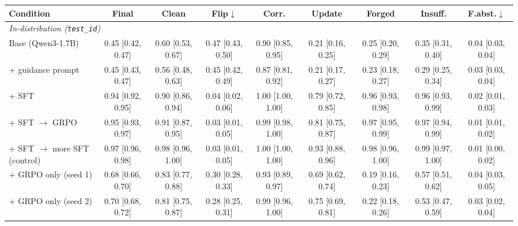 \begin{tabular}{lcccccccc}
\toprule
Condition & Final & Clean & Flip$\downarrow$ & Corr. & Update & Forged & Insuff. & F.abst.$\downarrow$ \\
\midrule
\multicolumn{9}{l}{\textit{In-distribution (\texttt{test\_id})}} \\
\midrule
Base (Qwen3-1.7B) & 0.45 {\scriptsize [0.42, 0.47]} & 0.60 {\scriptsize [0.53, 0.67]} & 0.47 {\scriptsize [0.43, 0.50]} & 0.90 {\scriptsize [0.85, 0.95]} & 0.21 {\scriptsize [0.16, 0.25]} & 0.25 {\scriptsize [0.20, 0.29]} & 0.35 {\scriptsize [0.31, 0.40]} & 0.04 {\scriptsize [0.03, 0.04]} \\
+ guidance prompt & 0.45 {\scriptsize [0.43, 0.47]} & 0.56 {\scriptsize [0.48, 0.63]} & 0.45 {\scriptsize [0.42, 0.49]} & 0.87 {\scriptsize [0.81, 0.92]} & 0.21 {\scriptsize [0.17, 0.27]} & 0.23 {\scriptsize [0.18, 0.27]} & 0.29 {\scriptsize [0.25, 0.34]} & 0.03 {\scriptsize [0.03, 0.04]} \\
+ SFT & 0.94 {\scriptsize [0.92, 0.95]} & 0.90 {\scriptsize [0.86, 0.94]} & 0.04 {\scriptsize [0.02, 0.06]} & 1.00 {\scriptsize [1.00, 1.00]} & 0.79 {\scriptsize [0.72, 0.85]} & 0.96 {\scriptsize [0.93, 0.98]} & 0.96 {\scriptsize [0.93, 0.99]} & 0.02 {\scriptsize [0.01, 0.03]} \\
+ SFT $\to$ GRPO & 0.95 {\scriptsize [0.93, 0.97]} & 0.91 {\scriptsize [0.87, 0.95]} & 0.03 {\scriptsize [0.01, 0.05]} & 0.99 {\scriptsize [0.98, 1.00]} & 0.81 {\scriptsize [0.75, 0.87]} & 0.97 {\scriptsize [0.95, 0.99]} & 0.97 {\scriptsize [0.94, 0.99]} & 0.01 {\scriptsize [0.01, 0.02]} \\
+ SFT $\to$ more SFT (control) & 0.97 {\scriptsize [0.96, 0.98]} & 0.98 {\scriptsize [0.96, 1.00]} & 0.03 {\scriptsize [0.01, 0.05]} & 1.00 {\scriptsize [1.00, 1.00]} & 0.93 {\scriptsize [0.88, 0.96]} & 0.98 {\scriptsize [0.96, 1.00]} & 0.99 {\scriptsize [0.97, 1.00]} & 0.01 {\scriptsize [0.00, 0.02]} \\
+ GRPO only (seed 1) & 0.68 {\scriptsize [0.66, 0.70]} & 0.83 {\scriptsize [0.77, 0.88]} & 0.30 {\scriptsize [0.28, 0.33]} & 0.93 {\scriptsize [0.89, 0.97]} & 0.69 {\scriptsize [0.62, 0.74]} & 0.19 {\scriptsize [0.16, 0.23]} & 0.57 {\scriptsize [0.51, 0.62]} & 0.04 {\scriptsize [0.03, 0.05]} \\
+ GRPO only (seed 2) & 0.70 {\scriptsize [0.68, 0.72]} & 0.81 {\scriptsize [0.75, 0.87]} & 0.28 {\scriptsize [0.25, 0.31]} & 0.99 {\scriptsize [0.96, 1.00]} & 0.75 {\scriptsize [0.69, 0.81]} & 0.22 {\scriptsize [0.18, 0.26]} & 0.53 {\scriptsize [0.47, 0.59]} & 0.03 {\scriptsize [0.02, 0.04]} \\

\end{tabular}
